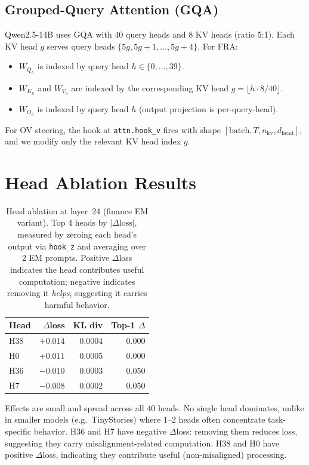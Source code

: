 \documentclass{article} %
\theoremstyle{plain}
\theoremstyle{definition}
\theoremstyle{remark}
\newcommand{\dhead}{d_{\mathrm{head}}}
\begin{document}
\subsection{Grouped-Query Attention (GQA)}
\label{app:gqa}

Qwen2.5-14B uses GQA with 40 query heads and 8 KV heads (ratio 5:1). Each KV head $g$ serves query heads $\{5g, 5g+1, \ldots, 5g+4\}$. For FRA:
\begin{itemize}
    \item $W_{Q_h}$ is indexed by query head $h \in \{0, \ldots, 39\}$.
    \item $W_{K_h}$ and $W_{V_h}$ are indexed by the corresponding KV head $g = \lfloor h \cdot 8 / 40 \rfloor$.
    \item $W_{O_h}$ is indexed by query head $h$ (output projection is per-query-head).
\end{itemize}
For OV steering, the hook at \texttt{attn.hook\_v} fires with shape $[\text{batch}, T, n_{\mathrm{kv}}, \dhead]$, and we modify only the relevant KV head index $g$.

\section{Head Ablation Results}
\label{app:head_ablation}

\begin{table}[h]
\caption{Head ablation at layer~24 (finance EM variant). Top 4 heads by $|\Delta\text{loss}|$, measured by zeroing each head's output via \texttt{hook\_z} and averaging over 2 EM prompts. Positive $\Delta$loss indicates the head contributes useful computation; negative indicates removing it \emph{helps}, suggesting it carries harmful behavior.}
\label{tab:head_ablation}
\centering
\begin{tabular}{lrrr}
\toprule
Head & $\Delta$loss & KL div & Top-1 $\Delta$ \\
\midrule
H38 & $+0.014$ & $0.0004$ & $0.000$ \\
H0  & $+0.011$ & $0.0005$ & $0.000$ \\
H36 & $-0.010$ & $0.0003$ & $0.050$ \\
H7  & $-0.008$ & $0.0002$ & $0.050$ \\
\bottomrule
\end{tabular}
\end{table}

Effects are small and spread across all 40 heads. No single head dominates, unlike in smaller models (e.g.\ TinyStories) where 1--2 heads often concentrate task-specific behavior. H36 and H7 have negative $\Delta$loss: removing them reduces loss, suggesting they carry misalignment-related computation. H38 and H0 have positive $\Delta$loss, indicating they contribute useful (non-misaligned) processing.
\end{document}
